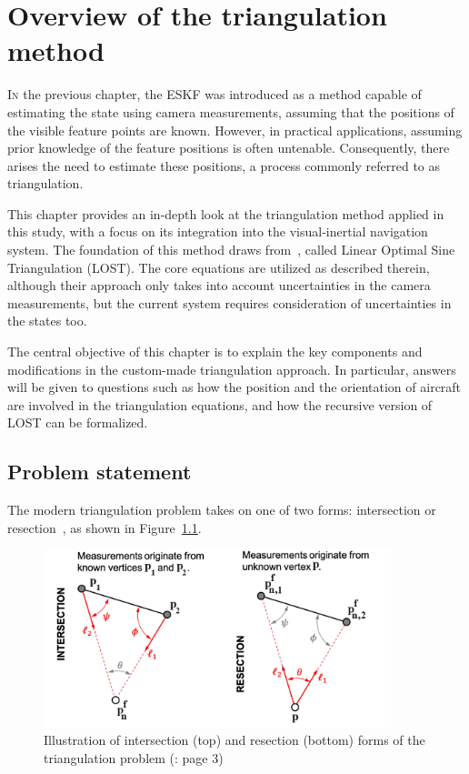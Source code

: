 \chapter{Overview of the triangulation method}\label{chap:LOST}

\lettrine{I}{n} the previous chapter, the ESKF was introduced as a method capable of estimating the state using camera measurements, assuming that the positions of the visible feature points are known. However, in practical applications, assuming prior knowledge of the feature positions is often untenable. Consequently, there arises the need to estimate these positions, a process commonly referred to as triangulation.

This chapter provides an in-depth look at the triangulation method applied in this study, with a focus on its integration into the visual-inertial navigation system. The foundation of this method draws from~\cite{absolute-triangulation}, called Linear Optimal Sine Triangulation (LOST). The core equations are utilized as described therein, although their approach only takes into account uncertainties in the camera measurements, but the current system requires consideration of uncertainties in the states too.

The central objective of this chapter is to explain the key components and modifications in the custom-made triangulation approach. In particular, answers will be given to questions such as how the position and the orientation of aircraft are involved in the triangulation equations, and how the recursive version of LOST can be formalized.\@

\section{Problem statement}

The modern triangulation problem takes on one of two forms: intersection or resection~\cite{ResectionInSurvey_1918}, as shown in Figure~\ref{fig:intersec-resec}.

\begin{figure}[!ht]
    \centering
    \includegraphics[width=0.9\textwidth]{figures/intersec-resec.png}
    \caption{Illustration of intersection (top) and resection (bottom) forms of the triangulation problem (\cite{absolute-triangulation}: page 3)}\label{fig:intersec-resec}
\end{figure}

